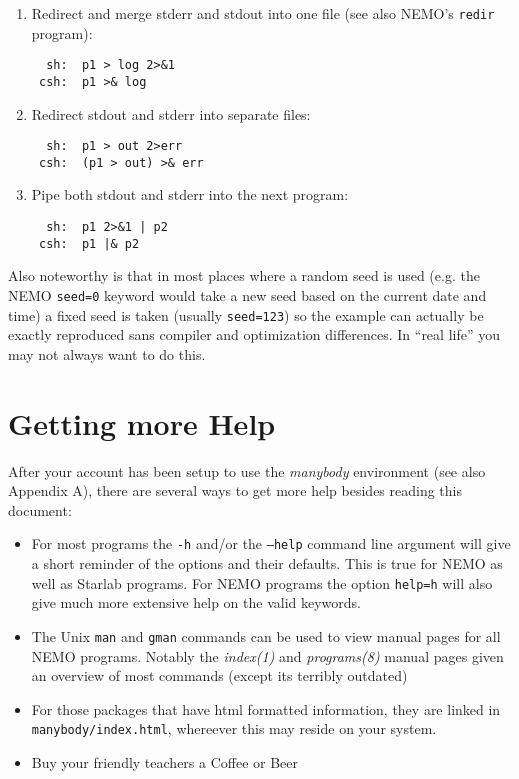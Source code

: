 \begin{enumerate}
\item 
Redirect and merge stderr and stdout into one file 
(see also NEMO's {\tt redir} program):
\footnotesize\begin{verbatim}
  sh:  p1 > log 2>&1
 csh:  p1 >& log
\end{verbatim}\normalsize
\item
Redirect stdout and stderr into separate files:
\footnotesize\begin{verbatim}
  sh:  p1 > out 2>err
 csh:  (p1 > out) >& err
\end{verbatim}\normalsize
\item
Pipe both stdout and stderr into the next program:
\footnotesize\begin{verbatim}
  sh:  p1 2>&1 | p2
 csh:  p1 |& p2
\end{verbatim}\normalsize
\end{enumerate}

Also noteworthy is that 
in most places where a random seed is used (e.g. the NEMO {\tt seed=0} keyword
would take a new seed based on the current date and time) 
a fixed seed is taken (usually {\tt seed=123}) 
so the example can actually be exactly reproduced sans compiler and optimization
differences. In ``real life'' you may not always want to do this.


\section*{Getting more Help}

After your account has been setup to use the {\it manybody} environment
(see also Appendix A), there are several ways to get more help besides
reading this document:
\begin{itemize}
\item
For most programs the {\tt -h} and/or the {\tt --help} 
command line argument will give a short
reminder of the options and their defaults. This is true for NEMO as well
as Starlab programs.
For NEMO programs the option {\tt help=h} will also give much more extensive help
on the valid keywords.

\item
The Unix {\tt man} and {\tt gman} commands can be used to view manual pages
for all NEMO programs. Notably the {\it index(1)} and {\it programs(8)}
manual pages given an overview of most commands (except its terribly
outdated)

\item
For those packages that have html formatted information, they are
linked in {\tt manybody/index.html}, whereever this may reside on your
system.

\item
Buy your friendly teachers a Coffee or Beer

\end{itemize}

